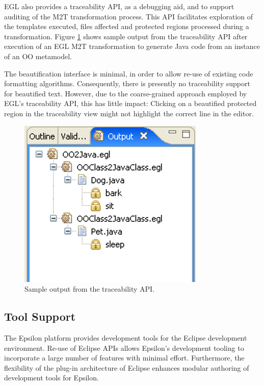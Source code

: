 EGL also provides a traceability API, as a debugging aid, and to
support auditing of the M2T transformation process.  This API
facilitates exploration of the templates executed, files affected and
protected regions processed during a transformation.  Figure
\ref{fig:traceability} shows sample output from the traceability API
after execution of an EGL M2T transformation to generate Java
code from an instance of an OO metamodel.

The beautification interface is minimal, in order to allow re-use of existing 
code formatting algorithms. Consequently, there is presently no traceability support 
for beautified text. However, due to the coarse-grained approach employed by 
EGL's traceability API, this has little impact: Clicking on a beautified protected 
region in the traceability view might not highlight the correct line in the editor.

\begin{figure}[htbp]
  \begin{center}
    \leavevmode
    \includegraphics[scale=0.6]{images/TraceView}
  \end{center}
  \caption{Sample output from the traceability API.}
  \label{fig:traceability}
\end{figure}

\subsection{Tool Support}
\label{Tool Support}
The Epsilon platform provides development tools for the Eclipse
development environment. Re-use of Eclipse APIs allows
Epsilon's development tooling to incorporate a large number of
features with minimal effort. Furthermore, the flexibility of the
plug-in architecture of Eclipse enhances modular authoring of
development tools for Epsilon.

